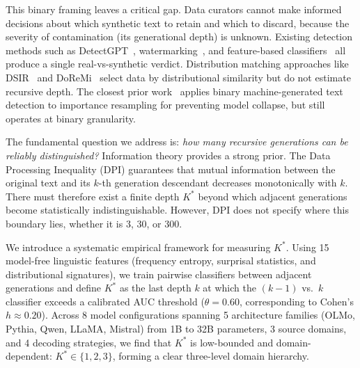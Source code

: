 \documentclass[11pt,a4paper]{article}
\begin{document}
This binary framing leaves a critical gap. Data curators cannot make informed decisions about which synthetic text to retain and which to discard, because the severity of contamination (its generational depth) is unknown. Existing detection methods such as DetectGPT~\citep{mitchell2023detectgpt}, watermarking~\citep{kirchenbauer2023watermark}, and feature-based classifiers~\citep{zellers2019defending} all produce a single real-vs-synthetic verdict. Distribution matching approaches like DSIR~\citep{xie2023data} and DoReMi~\citep{xie2024doremi} select data by distributional similarity but do not estimate recursive depth. The closest prior work~\citep{drayson2025contamination} applies binary machine-generated text detection to importance resampling for preventing model collapse, but still operates at binary granularity.

The fundamental question we address is: \emph{how many recursive generations can be reliably distinguished?} Information theory provides a strong prior. The Data Processing Inequality (DPI) guarantees that mutual information between the original text and its $k$-th generation descendant decreases monotonically with $k$. There must therefore exist a finite depth $K^*$ beyond which adjacent generations become statistically indistinguishable. However, DPI does not specify where this boundary lies, whether it is 3, 30, or 300.

We introduce a systematic empirical framework for measuring $K^*$. Using 15 model-free linguistic features (frequency entropy, surprisal statistics, and distributional signatures), we train pairwise classifiers between adjacent generations and define $K^*$ as the last depth $k$ at which the $(k\!-\!1)$ vs.\ $k$ classifier exceeds a calibrated AUC threshold ($\theta\!=\!0.60$, corresponding to Cohen's $h \approx 0.20$). Across 8 model configurations spanning 5 architecture families (OLMo, Pythia, Qwen, LLaMA, Mistral) from 1B to 32B parameters, 3 source domains, and 4 decoding strategies, we find that $K^*$ is low-bounded and domain-dependent: $K^*\!\in\!\{1,2,3\}$, forming a clear three-level domain hierarchy.
\end{document}
